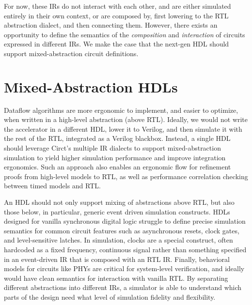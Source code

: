 \documentclass[sigplan,review,nonacm,9pt]{acmart}
\begin{document}
For now, these IRs do not interact with each other, and are either simulated entirely in their own context, or are composed by, first lowering to the RTL abstraction dialect, and then connecting them.
However, there exists an opportunity to define the semantics of the \textit{composition} and \textit{interaction} of circuits expressed in different IRs.
We make the case that the next-gen HDL should support mixed-abstraction circuit definitions.

\section{Mixed-Abstraction HDLs}


Dataflow algorithms are more ergonomic to implement, and easier to optimize, when written in a high-level abstraction (above RTL).
Ideally, we would not write the accelerator in a different HDL, lower it to Verilog, and then simulate it with the rest of the RTL, integrated as a Verilog blackbox.
Instead, a single HDL should leverage Circt's multiple IR dialects to support mixed-abstraction simulation to yield higher simulation performance and improve integration ergonomics\cite{pymtl3, esi}.
Such an approach also enables an ergonomic flow for refinement proofs from high-level models to RTL, as well as performance correlation checking between timed models and RTL.


An HDL should not only support mixing of abstractions above RTL, but also those below, in particular, generic event driven simulation constructs.
HDLs designed for vanilla synchronous digital logic struggle to define precise simulation semantics for common circuit features such as asynchronous resets, clock gates, and level-sensitive latches.
In simulation, clocks are a special construct, often hardcoded as a fixed frequency, continuous signal rather than something specified in an event-driven IR that is composed with an RTL IR.
Finally, behavioral models for circuits\cite{llhd} like PHYs are critical for system-level verification, and ideally would have clean semantics for interaction with vanilla RTL.
By separating different abstractions into different IRs, a simulator is able to understand which parts of the design need what level of simulation fidelity and flexibility.
\end{document}

